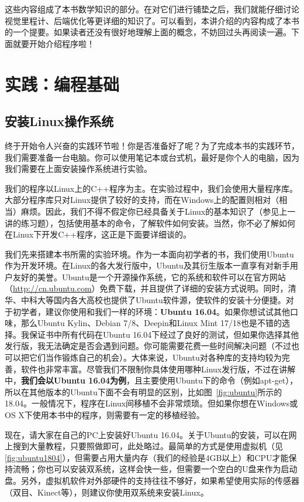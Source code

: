 这些内容组成了本书数学知识的部分。在对它们进行铺垫之后，我们就能仔细讨论视觉里程计、后端优化等更详细的知识了。可以看到，本讲介绍的内容构成了本书的一个提要。如果读者还没有很好地理解上面的概念，不妨回过头再阅读一遍。下面就要开始介绍程序啦！

\section{实践：编程基础}
\subsection{安装Linux操作系统}
终于开始令人兴奋的实践环节啦！你是否准备好了呢？为了完成本书的实践环节，我们需要准备一台电脑。你可以使用笔记本或台式机，最好是你个人的电脑，因为我们需要在上面安装操作系统进行实验。

我们的程序以Linux上的C++程序为主。在实验过程中，我们会使用大量程序库。大部分程序库只对Linux提供了较好的支持，而在Windows上的配置则相对（相当）麻烦。因此，我们不得不假定你已经具备关于Linux的基本知识了（参见上一讲的练习题），包括使用基本的命令，了解软件如何安装。当然，你不必了解如何在Linux下开发C++程序，这正是下面要详细谈的。

我们先来搭建本书所需的实验环境。作为一本面向初学者的书，我们使用Ubuntu作为开发环境。在Linux的各大发行版中，Ubuntu及其衍生版本一直享有对新手用户友好的美誉。Ubuntu是一个开源操作系统，它的系统和软件可以在官方网站（\url{http://cn.ubuntu.com}）免费下载，并且提供了详细的安装方式说明。同时，清华、中科大等国内各大高校也提供了Ubuntu软件源，使软件的安装十分便捷。对于初学者，建议你使用和我们一样的环境：\textbf{Ubuntu 16.04}。如果你想试试其他口味，那么Ubuntu Kylin、Debian 7/8、Deepin和Linux Mint 17/18也是不错的选择。我保证书中所有代码在Ubuntu 16.04下经过了良好的测试，但如果你选择其他发行版，我无法确定是否会遇到问题。你可能需要花费一些时间解决问题（不过也可以把它们当作锻炼自己的机会）。大体来说，Ubuntu对各种库的支持均较为完善，软件也非常丰富。尽管我们不限制你具体使用哪种Linux发行版，不过在讲解中，\textbf{我们会以Ubuntu 16.04为例}，且主要使用Ubuntu下的命令（例如apt-get），所以在其他版本的Ubuntu下面不会有明显的区别，比如图~\ref{fig:ubuntu}所示的18.04。一般情况下，程序在Linux间移植不会非常烦琐。但如果你想在Windows或OS X下使用本书中的程序，则需要有一定的移植经验。

现在，请大家在自己的PC上安装好Ubuntu 16.04。关于Ubuntu的安装，可以在网上搜到大量教程，只要照做即可，此处略过。最简单的方式是使用虚拟机（见\autoref{fig:ubuntu1804}），但需要占用大量内存（我们的经验是4GB以上）和CPU才能保持流畅；你也可以安装双系统，这样会快一些，但需要一个空白的U盘来作为启动盘。另外，虚拟机软件对外部硬件的支持往往不够好，如果希望使用实际的传感器（双目、Kinect等），则建议你使用双系统来安装Linux。

